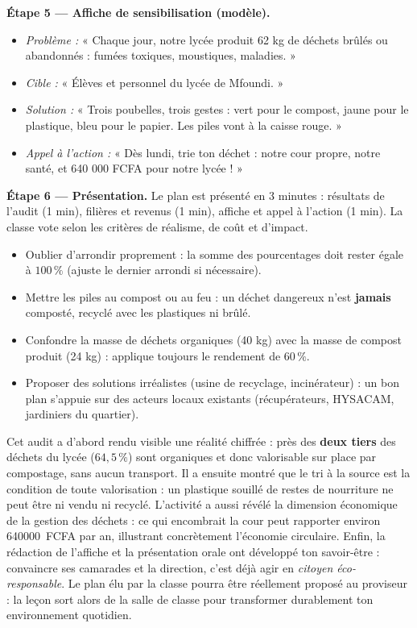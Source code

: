 \documentclass[11pt]{article}
\newcommand{\cle}[1]{{\popxbold\color{popdark}#1}}
\newcounter{popsec}
\newcounter{popsub}
\newcommand{\courssub}[1]{%
  \stepcounter{popsub}%
  \par\vspace{9pt}\noindent{\popxbold\fontsize{11.5}{13}\selectfont\color{popink}{\color{poporange}\thepopsec.\thepopsub}\hspace{6pt}#1}\par\nopagebreak\vspace{4pt}
}
\begin{document}
\begin{exoresolu}
\textbf{Étape 5 — Affiche de sensibilisation (modèle).}
\begin{itemize}
\item \emph{Problème :} « Chaque jour, notre lycée produit 62 kg de déchets brûlés ou abandonnés : fumées toxiques, moustiques, maladies. »
\item \emph{Cible :} « Élèves et personnel du lycée de Mfoundi. »
\item \emph{Solution :} « Trois poubelles, trois gestes : vert pour le compost, jaune pour le plastique, bleu pour le papier. Les piles vont à la caisse rouge. »
\item \emph{Appel à l'action :} « Dès lundi, trie ton déchet : notre cour propre, notre santé, et 640 000 FCFA pour notre lycée ! »
\end{itemize}

\textbf{Étape 6 — Présentation.} Le plan est présenté en 3 minutes : résultats de l'audit (1 min), filières et revenus (1 min), affiche et appel à l'action (1 min). La classe vote selon les critères de réalisme, de coût et d'impact.
\end{exoresolu}

\begin{attention}
\begin{itemize}
\item Oublier d'arrondir proprement : la somme des pourcentages doit rester égale à $100\,\%$ (ajuste le dernier arrondi si nécessaire).
\item Mettre les piles au compost ou au feu : un déchet dangereux n'est \textbf{jamais} composté, recyclé avec les plastiques ni brûlé.
\item Confondre la masse de déchets organiques (40 kg) avec la masse de compost produit (24 kg) : applique toujours le rendement de $60\,\%$.
\item Proposer des solutions irréalistes (usine de recyclage, incinérateur) : un bon plan s'appuie sur des acteurs locaux existants (récupérateurs, HYSACAM, jardiniers du quartier).
\end{itemize}
\end{attention}

\courssub{Bilan de l'activité}

Cet audit a d'abord rendu visible une réalité chiffrée : près des \textbf{deux tiers} des déchets du lycée ($64{,}5\,\%$) sont organiques et donc \cle{valorisable} sur place par compostage, sans aucun transport. Il a ensuite montré que le \cle{tri à la source} est la condition de toute valorisation : un plastique souillé de restes de nourriture ne peut être ni vendu ni recyclé. L'activité a aussi révélé la dimension économique de la gestion des déchets : ce qui encombrait la cour peut rapporter environ \SI{640000}{FCFA} par an, illustrant concrètement l'économie circulaire. Enfin, la rédaction de l'affiche et la présentation orale ont développé ton savoir-être : convaincre ses camarades et la direction, c'est déjà agir en \emph{citoyen éco-responsable}. Le plan élu par la classe pourra être réellement proposé au proviseur : la leçon sort alors de la salle de classe pour transformer durablement ton environnement quotidien.
\end{document}
